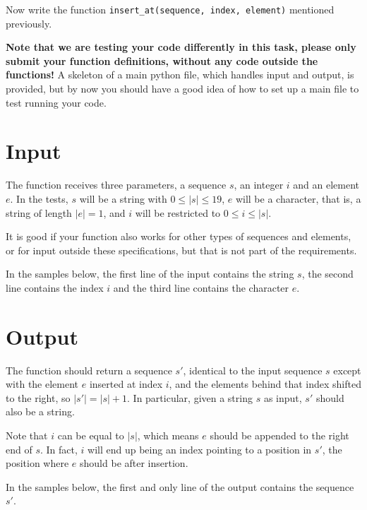 
Now write the function
\texttt{insert\_at(sequence, index, element)}
mentioned previously.

\textbf{Note that we are testing your code differently in this task,
please only submit your function definitions, without any code outside the functions!}
A skeleton of a main python file, which handles input and output, is provided,
but by now you should have a good idea of how to set up a main file to test running your code.

\section*{Input}
The function receives three parameters,
a sequence $s$, an integer $i$ and an element $e$.
In the tests, $s$ will be a string with $0 \le |s| \le 19$,
$e$ will be a character, that is, a string of length $|e| = 1$,
and $i$ will be restricted to $0 \le i \le |s|$.

It is good if your function also works for other types of sequences and elements,
or for input outside these specifications,
but that is not part of the requirements.

In the samples below,
the first line of the input contains the string $s$,
the second line contains the index $i$
and the third line contains the character $e$.

\section*{Output}

The function should return a sequence $s'$,
identical to the input sequence $s$
except with the element $e$ inserted at index $i$,
and the elements behind that index shifted to the right,
so $|s'| = |s| + 1$.
In particular, given a string $s$ as input, $s'$ should also be a string.

Note that $i$ can be equal to $|s|$,
which means $e$ should be appended to the right end of $s$.
In fact, $i$ will end up being an index pointing to a position in $s'$,
the position where $e$ should be after insertion.

In the samples below,
the first and only line of the output contains the sequence $s'$.
